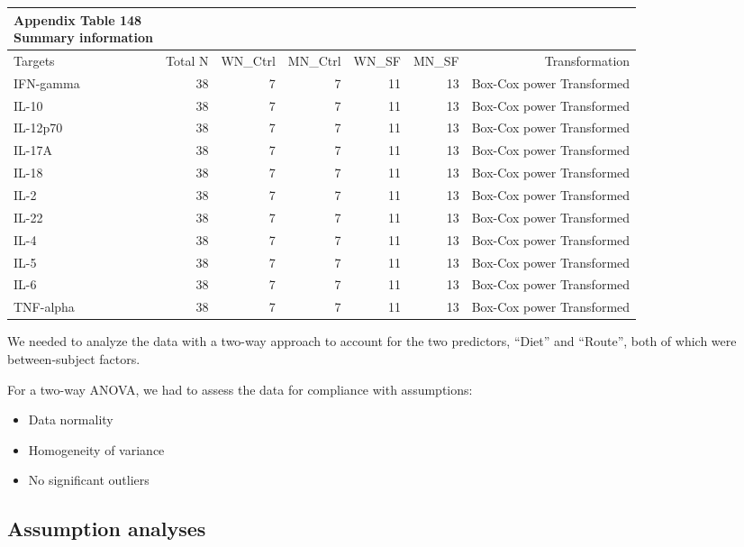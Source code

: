 \documentclass[
  12pt,
  letterpaper,
]{article}
\providecommand{\tightlist}{%
  \setlength{\itemsep}{0pt}\setlength{\parskip}{0pt}}
\begin{document}
\begingroup
\fontsize{12.0pt}{14.4pt}\selectfont
\begin{longtable}{l|rrrrrr}
\caption*{
{\large \textbf{Appendix Table 148}} \\ 
{\small \textbf{Summary information}}
} \\ 
\toprule
Targets & {Total N} & WN\_Ctrl & MN\_Ctrl & WN\_SF & MN\_SF & {Transformation} \\ 
\midrule\addlinespace[2.5pt]
IFN-gamma & 38 & 7 & 7 & 11 & 13 & Box-Cox power Transformed \\ 
IL-10 & 38 & 7 & 7 & 11 & 13 & Box-Cox power Transformed \\ 
IL-12p70 & 38 & 7 & 7 & 11 & 13 & Box-Cox power Transformed \\ 
IL-17A & 38 & 7 & 7 & 11 & 13 & Box-Cox power Transformed \\ 
IL-18 & 38 & 7 & 7 & 11 & 13 & Box-Cox power Transformed \\ 
IL-2 & 38 & 7 & 7 & 11 & 13 & Box-Cox power Transformed \\ 
IL-22 & 38 & 7 & 7 & 11 & 13 & Box-Cox power Transformed \\ 
IL-4 & 38 & 7 & 7 & 11 & 13 & Box-Cox power Transformed \\ 
IL-5 & 38 & 7 & 7 & 11 & 13 & Box-Cox power Transformed \\ 
IL-6 & 38 & 7 & 7 & 11 & 13 & Box-Cox power Transformed \\ 
TNF-alpha & 38 & 7 & 7 & 11 & 13 & Box-Cox power Transformed \\ 
\bottomrule
\end{longtable}
\endgroup

We needed to analyze the data with a two-way approach to account for the two predictors, ``Diet'' and ``Route'', both of which were between-subject factors.

For a two-way ANOVA, we had to assess the data for compliance with assumptions:

\begin{itemize}
\tightlist
\item
  Data normality
\item
  Homogeneity of variance
\item
  No significant outliers
\end{itemize}

\subsection{Assumption analyses}\label{assumption-analyses-5}
\end{document}
